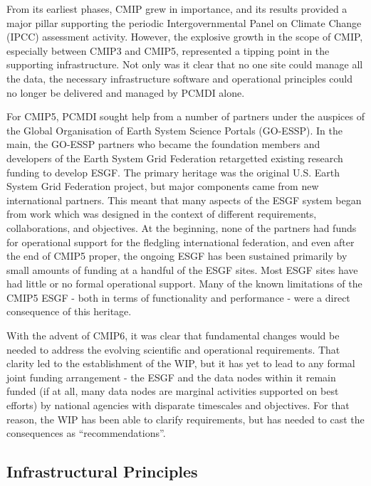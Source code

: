 \documentclass[gmd,manuscript]{copernicus}
\begin{document}
From its earliest phases, CMIP grew in importance, and its results
provided a major pillar supporting the periodic Intergovernmental
Panel on Climate Change (IPCC) assessment activity. However, the
explosive growth in the scope of CMIP, especially between CMIP3 and
CMIP5, represented a tipping point in the supporting infrastructure. Not
only was it clear that no one site could manage all the data, the 
necessary infrastructure software and operational principles could
no longer be delivered and managed by PCMDI alone. 

For CMIP5, PCMDI sought help from a number of partners under the
auspices of the Global Organisation of Earth System Science Portals
(GO-ESSP). In the main, the GO-ESSP partners who became the foundation
members and developers of the Earth System Grid Federation retargetted
existing research funding to develop ESGF. The primary heritage was
the original U.S. Earth System Grid Federation project, but major
components came from new international partners. This meant that many
aspects of the ESGF system began from work which was designed in the
context of different requirements, collaborations, and objectives. At
the beginning, none of the partners had funds for operational support
for the fledgling international federation, and even after the end of
CMIP5 proper, the ongoing ESGF has been sustained primarily by small
amounts of funding at a handful of the ESGF sites. Most ESGF sites
have had little or no formal operational support. Many of the known
limitations of the CMIP5 ESGF - both in terms of functionality and
performance - were a direct consequence of this heritage.

With the advent of CMIP6, it was clear that fundamental changes would
be needed to address the evolving scientific and operational
requirements. That clarity led to the establishment of the WIP, but it
has yet to lead to any formal joint funding arrangement - the ESGF and
the data nodes within it remain funded (if at all, many data nodes are
marginal activities supported on best efforts) by national agencies
with disparate timescales and objectives. For that reason, the WIP has
been able to clarify requirements, but has needed to cast the
consequences as ``recommendations''.

\subsection{Infrastructural Principles}
\end{document}
